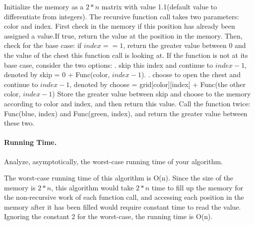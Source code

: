 Initialize the memory as a $2*n$ matrix with value 1.1(default value to differentiate from integers).
The recursive function call takes two parameters: color and index.\newline
First check in the memory if this position has already been assigned a value.If true, return the value at the position in the memory. \newline
Then, check for the base case: if $index == 1$, return the greater value between 0 and the value of the chest this function call is looking at.
If the function is not at its base case, consider the two options: . skip this index and continue to $index - 1$, denoted by skip = 0 + Func(color, $index - 1$). . choose to open the chest and continue to $index - 1$, denoted by choose  = grid[color][index] + Func(the other color, $index - 1$)\newline
Store the greater value between skip and choose to the memory according to color and index, and then return this value. \newline
Call the function twice: Func(blue, index) and Func(green, index), and return the greater value between these two.


\paragraph{Running Time.}
Analyze, asymptotically, the worst-case running time of your algorithm.

The worst-case running time of this algorithm is O(n). Since the size of the memory is $2*n$, this algorithm would take $2*n$ time to fill up the memory for the non-recursive work of each function call, and accessing each position in the memory after it has been filled would require constant time to read the value. Ignoring the constant $2$ for the worst-case, the running time is O(n).